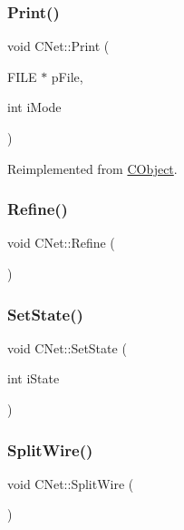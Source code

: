 \mbox{\label{classCNet_a94a51f1ccadf689a3bcfa167f37e12f5}} 
\subsubsection{\texorpdfstring{Print()}{Print()}}
{\footnotesize\ttfamily void C\+Net\+::\+Print (\begin{DoxyParamCaption}\item[{F\+I\+LE $\ast$}]{p\+File,  }\item[{int}]{i\+Mode }\end{DoxyParamCaption})\hspace{0.3cm}{\ttfamily [virtual]}}



Reimplemented from \mbox{\hyperlink{classCObject_a75afd905b2d14ed374c75d90f079a389}{C\+Object}}.

\mbox{\label{classCNet_ab63bb6fcabe98cabe6c02f525c937aec}} 
\subsubsection{\texorpdfstring{Refine()}{Refine()}}
{\footnotesize\ttfamily void C\+Net\+::\+Refine (\begin{DoxyParamCaption}{ }\end{DoxyParamCaption})}

\mbox{\label{classCNet_adecbdeeb33f6ef0a4f9cada16ffac585}} 
\subsubsection{\texorpdfstring{SetState()}{SetState()}}
{\footnotesize\ttfamily void C\+Net\+::\+Set\+State (\begin{DoxyParamCaption}\item[{int}]{i\+State }\end{DoxyParamCaption})}

\mbox{\label{classCNet_a26430ae6a0d001620b267e1456d290a1}} 
\subsubsection{\texorpdfstring{SplitWire()}{SplitWire()}}
{\footnotesize\ttfamily void C\+Net\+::\+Split\+Wire (\begin{DoxyParamCaption}{ }\end{DoxyParamCaption})}

